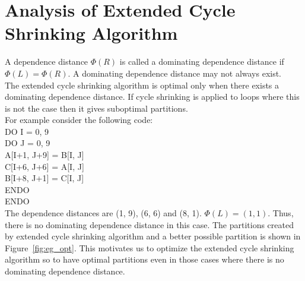 \chapter{Analysis of Extended Cycle Shrinking Algorithm}

A dependence distance $\Phi(R)$ is called a dominating dependence distance if $\Phi(L) = \Phi(R)$. A dominating dependence distance may not always exist.  \\

The extended cycle shrinking algorithm is optimal only when there exists a dominating dependence distance. If cycle shrinking is applied to loops where this is not the case then it gives suboptimal partitions. \\

\noindent For example consider the following code: \\
DO I = 0, 9 \\
\indent DO J = 0, 9 \\
\indent \indent A[I+1, J+9] = B[I, J] \\
\indent \indent C[I+6, J+6] = A[I, J] \\
\indent \indent B[I+8, J+1] = C[I, J] \\
\indent ENDO \\
ENDO \\

The dependence distances are (1, 9), (6, 6) and (8, 1). $\Phi(L) = (1, 1)$. Thus, there is no dominating dependence distance in this case. The partitions created by extended cycle shrinking algorithm and a better possible partition is shown in Figure~\ref{fig:eg_opt}. This motivates us to optimize the extended cycle shrinking algorithm so to have optimal partitions even in those cases where there is no dominating dependence distance.\\

